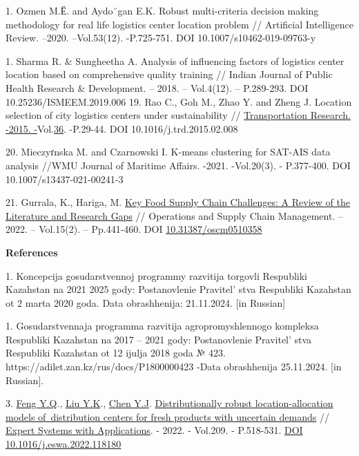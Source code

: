 1. Ozmen M.Ё. and Aydo˘gan E.K. Robust multi-criteria decision making
methodology for real life logistics center location problem //
Artificial Intelligence Review. --2020. --Vol.53(12). -P.725-751.
DOI 10.1007/s10462-019-09763-y

1. Sharma R. \& Sungheetha A. Analysis of influencing factors of
logistics center location based on comprehensive quality training //
Indian Journal of Public Health Research \& Development. -- 2018. --
Vol.4(12). -- P.289-293. DOI 10.25236/ISMEEM.2019.006
19. Rao C., Goh M., Zhao Y. and Zheng J. Location selection of city
logistics centers under sustainability //
\href{https://www.sciencedirect.com/journal/transportation-research-part-d-transport-and-environment}{Transportation
Research. -2015.
-}Vol.\href{file:///C:/Users/admin/Desktop/загрузки/36}{36}. -P.29-44.
DOI 10.1016/j.trd.2015.02.008

20. Mieczyґnska M. and Czarnowski I. K-means clustering for SAT-AIS data
analysis //WMU Journal of Maritime Affairs. -2021. -Vol.20(3). -
P.377-400. DOI 10.1007/s13437-021-00241-3

21. Gurrala, K., Hariga, M.
\href{https://journal.oscm-forum.org/publication/article/key-food-supply-chain-challenges-a-review-of-the-literature-and-research-gaps}{Key
Food Supply Chain Challenges: A Review of the Literature and Research
Gaps} // Operations and Supply Chain Management. -- 2022. -- Vol.15(2).
-- Pp.441-460. DOI
\href{http://doi.org/10.31387/oscm0510358}{10.31387/oscm0510358}

{\bfseries References}


1. Koncepcija gosudarstvennoj programmy razvitija torgovli Respubliki
Kazahstan na 2021
2025 gody: Postanovlenie Pravitel' stva Respubliki
Kazahstan ot 2 marta 2020 goda.
\href{https://www.gov.kz/memleket/entities/mti/documents/details/61426?lang=ru-}{}
Data obrashhenija: 21.11.2024. {[}in Russian{]}

\setcounter{enumi}{1}

1. Gosudarstvennaja programma razvitija agropromyshlennogo kompleksa
Respubliki Kazahstan
na 2017 -- 2021 gody: Postanovlenie Pravitel' stva
Respubliki Kazahstan ot 12 ijulja 2018 goda № 423.
https://adilet.zan.kz/rus/docs/P1800000423 -Data obrashhenija
25.11.2024. {[}in Russian{]}.

3. \href{https://www.webofscience.com/wos/author/record/34864370}{Feng
Y.Q}.,
\href{https://www.webofscience.com/wos/author/record/33997583}{Liu
Y.K}.,
\href{https://www.webofscience.com/wos/author/record/34807908}{Chen
Y.J}.
\href{https://www.webofscience.com/wos/woscc/full-record/WOS:000859686100002}{Distributionally
robust location-allocation models of~distribution centers for fresh
products with uncertain demands} //
\href{https://www.sciencedirect.com/journal/expert-systems-with-applications}{Expert
Systems with Applications}. - 2022. - Vol.209. - P.518-531.
\href{https://doi.org/10.1016/j.eswa.2022.118180}{DOI
10.1016/j.eswa.2022.118180}

